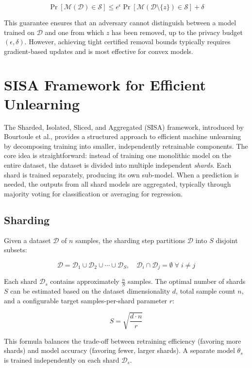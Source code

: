 \[
\Pr[\mathcal{M}(\mathcal{D}) \in \mathcal{S}] \leq e^\epsilon \Pr[\mathcal{M}(\mathcal{D} \setminus \{z\}) \in \mathcal{S}] + \delta
\]

This guarantee ensures that an adversary cannot distinguish between a model trained on $\mathcal{D}$ and one from which $z$ has been removed, up to the privacy budget $(\epsilon, \delta)$. However, achieving tight certified removal bounds typically requires gradient-based updates and is most effective for convex models.

\section{SISA Framework for Efficient Unlearning}

The Sharded, Isolated, Sliced, and Aggregated (SISA) framework, introduced by Bourtoule et al., provides a structured approach to efficient machine unlearning by decomposing training into smaller, independently retrainable components. The core idea is straightforward: instead of training one monolithic model on the entire dataset, the dataset is divided into multiple independent \textit{shards}. Each shard is trained separately, producing its own sub-model. When a prediction is needed, the outputs from all shard models are aggregated, typically through majority voting for classification or averaging for regression.

\subsection{Sharding}
Given a dataset $\mathcal{D}$ of $n$ samples, the sharding step partitions $\mathcal{D}$ into $S$ disjoint subsets:

\[
\mathcal{D} = \mathcal{D}_1 \cup \mathcal{D}_2 \cup \cdots \cup \mathcal{D}_S, \quad \mathcal{D}_i \cap \mathcal{D}_j = \emptyset \; \forall \; i \neq j
\]

Each shard $\mathcal{D}_s$ contains approximately $\frac{n}{S}$ samples. The optimal number of shards $S$ can be estimated based on the dataset dimensionality $d$, total sample count $n$, and a configurable target samples-per-shard parameter $r$:

\[
S = \sqrt{\frac{d \cdot n}{r}}
\]

This formula balances the trade-off between retraining efficiency (favoring more shards) and model accuracy (favoring fewer, larger shards). A separate model $\theta_s$ is trained independently on each shard $\mathcal{D}_s$.


